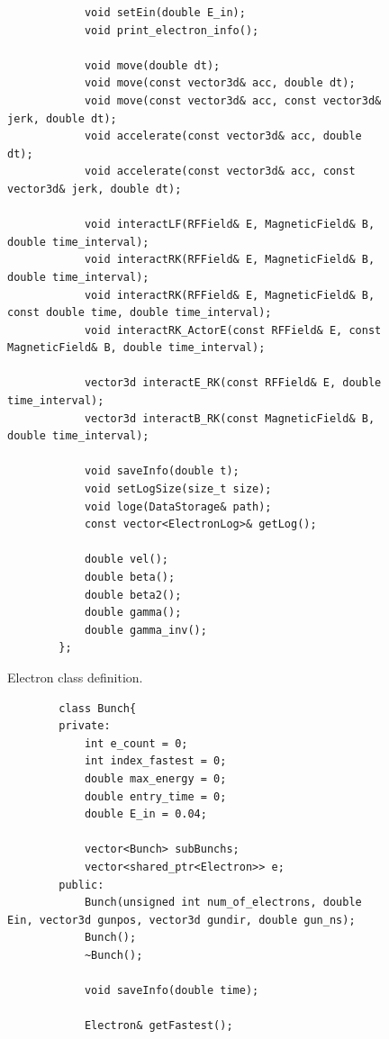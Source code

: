\documentclass[a4paper,oneside,12pt]{report}
\numberwithin{equation}{chapter}
\begin{document}
{\begin{figure}[H]
\begin{verbatim}
            void setEin(double E_in);
            void print_electron_info();

            void move(double dt);
            void move(const vector3d& acc, double dt);
            void move(const vector3d& acc, const vector3d& jerk, double dt);
            void accelerate(const vector3d& acc, double dt);
            void accelerate(const vector3d& acc, const vector3d& jerk, double dt);
            
            void interactLF(RFField& E, MagneticField& B, double time_interval);
            void interactRK(RFField& E, MagneticField& B, double time_interval);
            void interactRK(RFField& E, MagneticField& B, const double time, double time_interval);
            void interactRK_ActorE(const RFField& E, const MagneticField& B, double time_interval);

            vector3d interactE_RK(const RFField& E, double time_interval);
            vector3d interactB_RK(const MagneticField& B, double time_interval);

            void saveInfo(double t);
            void setLogSize(size_t size);
            void loge(DataStorage& path);
            const vector<ElectronLog>& getLog();

            double vel();
            double beta();
            double beta2();
            double gamma();
            double gamma_inv();
        };
    \end{verbatim}
    \vspace{20pt}
    \caption{Electron class definition.}
    \label{fig:e_class}
\end{figure}

\begin{figure}[H]
    \centering
    \begin{verbatim}
        class Bunch{
        private:
            int e_count = 0;
            int index_fastest = 0;
            double max_energy = 0;
            double entry_time = 0;
            double E_in = 0.04;

            vector<Bunch> subBunchs;
            vector<shared_ptr<Electron>> e;
        public:
            Bunch(unsigned int num_of_electrons, double Ein, vector3d gunpos, vector3d gundir, double gun_ns);
            Bunch();
            ~Bunch();

            void saveInfo(double time);

            Electron& getFastest();


\end{verbatim}
\end{figure}}
\end{document}
